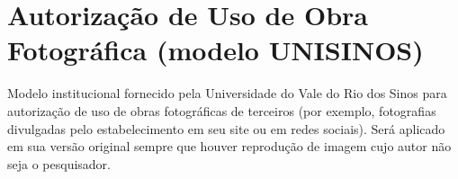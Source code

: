 \chapter{Autorização de Uso de Obra Fotográfica (modelo UNISINOS)}
\label{an:obra-fotografica}

Modelo institucional fornecido pela Universidade do Vale do Rio dos Sinos para autorização de uso de obras fotográficas de terceiros (por exemplo, fotografias divulgadas pelo estabelecimento em seu site ou em redes sociais). Será aplicado em sua versão original sempre que houver reprodução de imagem cujo autor não seja o pesquisador.


